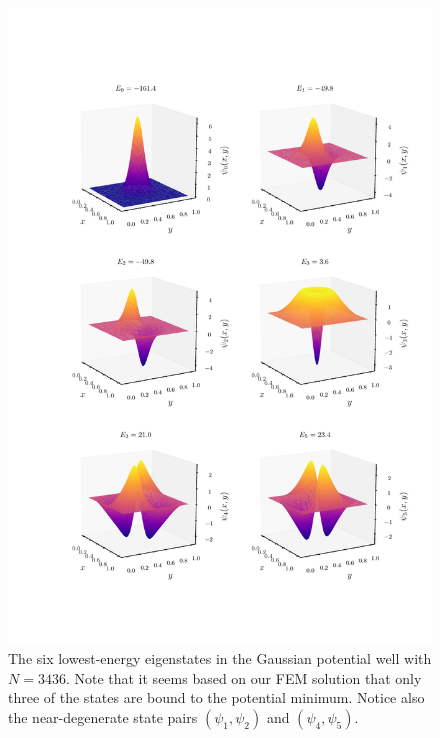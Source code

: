 \documentclass[a4paper,12pt]{article}
\begin{document}
\begin{figure}[H]
\centering
\vspace{-5cm}
\includegraphics[width=\textwidth]{../figs/eigenfuncs_gauss.pdf}
\caption{The six lowest-energy eigenstates in the Gaussian potential well with $N=3436$. Note that it seems based on our FEM solution that only three of the states are bound to the potential minimum. Notice also the near-degenerate state pairs $(\psi_1, \psi_2)$ and $(\psi_4, \psi_5)$.}
\label{fig: gaussEigFuncs}
\end{figure}
\end{document}

